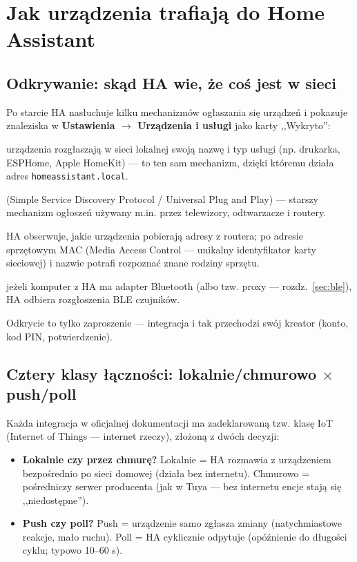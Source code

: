 \documentclass[11pt,a4paper]{article}
\begin{document}
\section{Jak urządzenia trafiają do Home Assistant}
\label{sec:trafiaja}

\subsection{Odkrywanie: skąd HA wie, że coś jest w sieci}

Po starcie HA nasłuchuje kilku mechanizmów ogłaszania się urządzeń i pokazuje znaleziska w \textbf{Ustawienia $\to$ Urządzenia i usługi} jako karty ,,Wykryto'':

\begin{description}[style=nextline]
\item[mDNS / zeroconf] urządzenia rozgłaszają w sieci lokalnej swoją nazwę i typ usługi (np. drukarka, ESPHome, Apple HomeKit) --- to ten sam mechanizm, dzięki któremu działa adres \texttt{homeassistant.local}.
\item[SSDP / UPnP] (Simple Service Discovery Protocol / Universal Plug and Play) --- starszy mechanizm ogłoszeń używany m.in. przez telewizory, odtwarzacze i routery.
\item[Nasłuch DHCP] HA obserwuje, jakie urządzenia pobierają adresy z routera; po adresie sprzętowym MAC (Media Access Control --- unikalny identyfikator karty sieciowej) i nazwie potrafi rozpoznać znane rodziny sprzętu.
\item[Bluetooth] jeżeli komputer z HA ma adapter Bluetooth (albo tzw. proxy --- rozdz.~\ref{sec:ble}), HA odbiera rozgłoszenia BLE czujników.
\end{description}

Odkrycie to tylko zaproszenie --- integracja i tak przechodzi swój kreator (konto, kod PIN, potwierdzenie).

\subsection{Cztery klasy łączności: lokalnie/chmurowo $\times$ push/poll}

Każda integracja w oficjalnej dokumentacji ma zadeklarowaną tzw. klasę IoT (Internet of Things --- internet rzeczy), złożoną z dwóch decyzji:

\begin{itemize}
\item \textbf{Lokalnie czy przez chmurę?} Lokalnie = HA rozmawia z urządzeniem bezpośrednio po sieci domowej (działa bez internetu). Chmurowo = pośredniczy serwer producenta (jak w Tuya --- bez internetu encje stają się ,,niedostępne'').
\item \textbf{Push czy poll?} Push = urządzenie samo zgłasza zmiany (natychmiastowe reakcje, mało ruchu). Poll = HA cyklicznie odpytuje (opóźnienie do długości cyklu; typowo 10--60 s).
\end{itemize}
\end{document}
